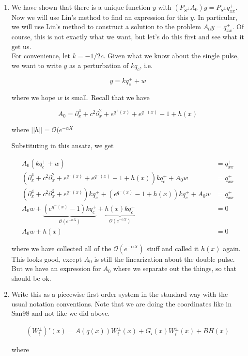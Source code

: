 \documentclass[12pt]{article}
\begin{document}
\begin{enumerate}
\item We have shown that there is a unique function $y$ with $(P_{S^\perp} A_0) y = P_{S^\perp} q^+_{xx}$. Now we will use Lin's method to find an expression for this $y$. In particular, we will use Lin's method to construct a solution to the problem $A_0 y = q^+_{xx}$. Of course, this is not exactly what we want, but let's do this first and see what it get us.\\

For convenience, let $k = -1/2c$. Given what we know about the single pulse, we want to write $y$ as a perturbation of $k q_c$, i.e. 

\[
y = k q^+_c + w
\]

where we hope $w$ is small. Recall that we have

\[
A_0 = \partial_x^4 + c^2 \partial_x^2 + e^{q^+(x)} + e^{q^-(x)} - 1 + h(x)
\]

where $||h|| = \mathcal{O}(e^{-\alpha X}$

Substituting in this ansatz, we get

\begin{align*}
A_0 (k q^+_c + w) &= q^+_{xx} \\
(\partial_x^4 + c^2 \partial_x^2 + e^{q^+(x)} + e^{q^-(x)} - 1 + h(x))k q^+_c + A_0 w &= q^+_{xx} \\
(\partial_x^4 + c^2 \partial_x^2 + e^{q^+(x)})k q^+_c + (e^{q^-(x)} - 1 + h(x))kq^+_c + A_0 w &= q^+_{xx} \\
A_0 w + \underbrace{(e^{q^-(x)} - 1) kq^+_c}_{\mathcal{O}(e^{-\alpha X})} 
+ \underbrace{h(x) kq^+_c}_{\mathcal{O}(e^{-\alpha X})} &= 0 \\
A_0 w + h(x) &= 0
\end{align*}

where we have collected all of the $\mathcal{O}(e^{-\alpha X})$ stuff and called it $h(x)$ again. This looks good, except $A_0$ is still the linearization about the double pulse. But we have an expression for $A_0$ where we separate out the things, so that should be ok.

\item Write this as a piecewise first order system in the standard way with the usual notation conventions. Note that we are doing the coordinates like in San98 and not like we did above.

\begin{align*}
(W_i^\pm)'(x) = A(q(x)) W_i^\pm(x) + G_i(x) W_i^\pm(x)+ B H(x)
\end{align*}

where


\end{enumerate}
\end{document}
